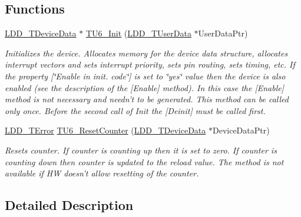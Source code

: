 \subsection*{Functions}
\begin{DoxyCompactItemize}
\item 
\hyperlink{group___p_e___types__module_gac5cf1362f1f0e3a2ce71b1bf2276d091}{L\-D\-D\-\_\-\-T\-Device\-Data} $\ast$ \hyperlink{group___t_u6__module_ga5a64889badba7f6e42d3cc669d9e8fba}{T\-U6\-\_\-\-Init} (\hyperlink{group___p_e___types__module_ga0b66a73f87238a782318aa0be7578e35}{L\-D\-D\-\_\-\-T\-User\-Data} $\ast$User\-Data\-Ptr)
\begin{DoxyCompactList}\small\item\em Initializes the device. Allocates memory for the device data structure, allocates interrupt vectors and sets interrupt priority, sets pin routing, sets timing, etc. If the property \mbox{[}\char`\"{}\-Enable in init. code\char`\"{}\mbox{]} is set to \char`\"{}yes\char`\"{} value then the device is also enabled (see the description of the \mbox{[}Enable\mbox{]} method). In this case the \mbox{[}Enable\mbox{]} method is not necessary and needn't to be generated. This method can be called only once. Before the second call of Init the \mbox{[}Deinit\mbox{]} must be called first. \end{DoxyCompactList}\item 
\hyperlink{group___p_e___types__module_ga24c2b045fd04e79e85f261ce4df35588}{L\-D\-D\-\_\-\-T\-Error} \hyperlink{group___t_u6__module_ga19c9c41ebde0ddfdd0887e0562390085}{T\-U6\-\_\-\-Reset\-Counter} (\hyperlink{group___p_e___types__module_gac5cf1362f1f0e3a2ce71b1bf2276d091}{L\-D\-D\-\_\-\-T\-Device\-Data} $\ast$Device\-Data\-Ptr)
\begin{DoxyCompactList}\small\item\em Resets counter. If counter is counting up then it is set to zero. If counter is counting down then counter is updated to the reload value. The method is not available if H\-W doesn't allow resetting of the counter. \end{DoxyCompactList}\end{DoxyCompactItemize}


\subsection{Detailed Description}


